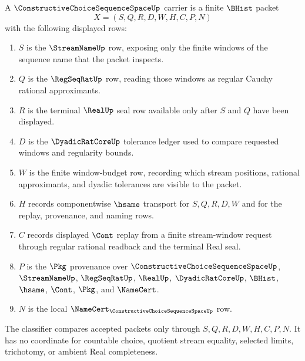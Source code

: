 \begin{definition}
\label{def:constructive-choice-sequence-space-carrier}
A $\ConstructiveChoiceSequenceSpaceUp$ carrier is a finite $\BHist$ packet
$$
X=(S,Q,R,D,W,H,C,P,N)
$$
with the following displayed rows:
\begin{enumerate}
\item $S$ is the $\StreamNameUp$ row, exposing only the finite windows of the sequence name that the packet inspects.
\item $Q$ is the $\RegSeqRatUp$ row, reading those windows as regular Cauchy rational approximants.
\item $R$ is the terminal $\RealUp$ seal row available only after $S$ and $Q$ have been displayed.
\item $D$ is the $\DyadicRatCoreUp$ tolerance ledger used to compare requested windows and regularity bounds.
\item $W$ is the finite window-budget row, recording which stream positions, rational approximants, and dyadic tolerances are visible to the packet.
\item $H$ records componentwise $\hsame$ transport for $S,Q,R,D,W$ and for the replay, provenance, and naming rows.
\item $C$ records displayed $\Cont$ replay from a finite stream-window request through regular rational readback and the terminal Real seal.
\item $P$ is the $\Pkg$ provenance over $\ConstructiveChoiceSequenceSpaceUp$, $\StreamNameUp$, $\RegSeqRatUp$, $\RealUp$, $\DyadicRatCoreUp$, $\BHist$, $\hsame$, $\Cont$, $\Pkg$, and $\NameCert$.
\item $N$ is the local $\NameCert_{\ConstructiveChoiceSequenceSpaceUp}$ row.
\end{enumerate}
The classifier compares accepted packets only through $S,Q,R,D,W,H,C,P,N$. It has no coordinate for countable choice, quotient stream equality, selected limits, trichotomy, or ambient Real completeness.
\end{definition}

